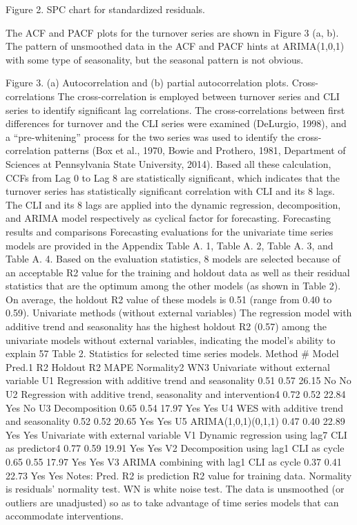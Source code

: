 Figure 2. SPC chart for standardized residuals.

The ACF and PACF plots for the turnover series are shown in Figure 3 (a, b). The pattern of unsmoothed data in the ACF and PACF hints at ARIMA(1,0,1) with some type of seasonality, but the seasonal pattern is not obvious.

Figure 3. (a) Autocorrelation and (b) partial autocorrelation plots.
Cross-correlations 
The cross-correlation is employed between turnover series and CLI series to identify significant lag correlations. The cross-correlations between first differences for turnover and the CLI series were examined (DeLurgio, 1998), and a “pre-whitening” process for the two series was used to identify the cross-correlation patterns (Box et al., 1970, Bowie and Prothero, 1981, Department of Sciences at Pennsylvania State University, 2014). Based all these calculation, CCFs from Lag 0 to Lag 8 are statistically significant, which indicates that the turnover series has statistically significant correlation with CLI and its 8 lags. The CLI and its 8 lags are applied into the dynamic regression, decomposition, and ARIMA model respectively as cyclical factor for forecasting.  
Forecasting results and comparisons
Forecasting evaluations for the univariate time series models are provided in the Appendix Table A. 1, Table A. 2, Table A. 3, and Table A. 4. Based on the evaluation statistics, 8 models are selected because of an acceptable R2 value for the training and holdout data as well as their residual statistics that are the optimum among the other models (as shown in Table 2).  On average, the holdout R2 value of these models is 0.51 (range from 0.40 to 0.59). 
Univariate methods (without external variables)
The regression model with additive trend and seasonality has the highest holdout R2 (0.57) among the univariate models without external variables, indicating the model’s ability to explain 57%
Table 2. Statistics for selected time series models.
Method	#	Model	Pred.1 R2	Holdout R2	MAPE	Normality2	WN3
Univariate without external variable 	U1	Regression with additive trend and seasonality	0.51	0.57	26.15	No	No
U2	Regression with additive trend, seasonality and intervention4 	0.72	0.52	22.84	Yes	No
U3	Decomposition	0.65	0.54	17.97	Yes	Yes
U4	WES with additive trend and seasonality	0.52	0.52	20.65	Yes	Yes
U5	ARIMA(1,0,1)(0,1,1)	0.47	0.40	22.89	Yes	Yes
Univariate with external variable	V1	Dynamic regression using  lag7 CLI as predictor4	0.77	0.59	19.91	Yes	Yes
V2	Decomposition using  lag1 CLI as cycle	0.65	0.55	17.97	Yes	Yes
V3	ARIMA combining with lag1 CLI as cycle	0.37	0.41	22.73	Yes	Yes
Notes: 
Pred. R2 is prediction R2 value for training data. 
Normality is residuals’ normality test. 
WN is white noise test. 
The data is unsmoothed (or outliers are unadjusted) so as to take advantage of time series models that can accommodate interventions. 

